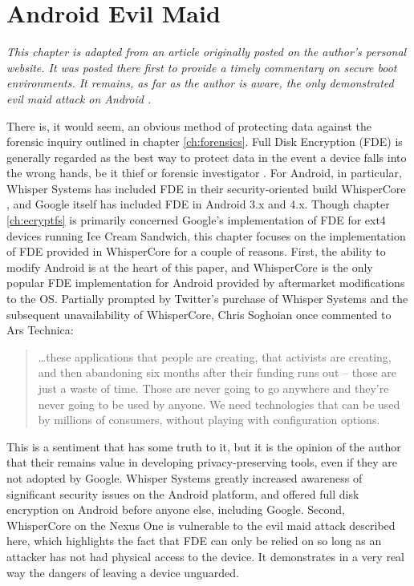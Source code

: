 \chapter{Android Evil Maid}
\label{ch:fde}

\emph{This chapter is adapted from an article originally posted on the author's personal website. It was posted there first to
provide a timely commentary on secure boot environments. It remains, as far as the author is aware, the only demonstrated evil maid
attack on Android \cite{androidevilmaid}.}

There is, it would seem, an obvious method of protecting data against the forensic inquiry outlined in chapter \ref{ch:forensics}.
Full Disk Encryption (FDE) is generally regarded as the best way to protect data in the event a device falls into the wrong hands,
be it thief or forensic investigator \cite{fdeworks}.  For Android, in particular, Whisper Systems has included FDE in their
security-oriented build WhisperCore \cite{whispercore}, and Google itself has included FDE in Android 3.x and 4.x. Though chapter
\ref{ch:ecryptfs} is primarily concerned Google's implementation of FDE for ext4 devices running Ice Cream Sandwich, this chapter
focuses on the implementation of FDE provided in WhisperCore for a couple of reasons.  First, the ability to modify Android is at
the heart of this paper, and WhisperCore is the only popular FDE implementation for Android provided by aftermarket modifications to
the OS.  Partially prompted by Twitter's purchase of Whisper Systems and the subsequent unavailability of WhisperCore, Chris
Soghoian once commented to Ars Technica: \begin{quote} 
\ldots these applications that people are creating, that activists are creating, and then abandoning six months after their funding
runs out -- those are just a waste of time. Those are never going to go anywhere and they're never going to be used by anyone. We
need technologies that can be used by millions of consumers, without playing with configuration options. 

\hspace{\fill}\cite{arstechnica}
\end{quote}
This is a sentiment that has some truth to it, but it is the opinion of the author that their remains value in
developing privacy-preserving tools, even if they are not adopted by Google.  Whisper Systems greatly increased awareness of significant
security issues on the Android platform, and offered full disk encryption on Android before anyone else, including Google. Second,
WhisperCore on the Nexus One is vulnerable to the evil maid attack described here, which highlights the fact that FDE can only be
relied on so long as an attacker has not had physical access to the device. It demonstrates in a very real way the dangers of
leaving a device unguarded. 

